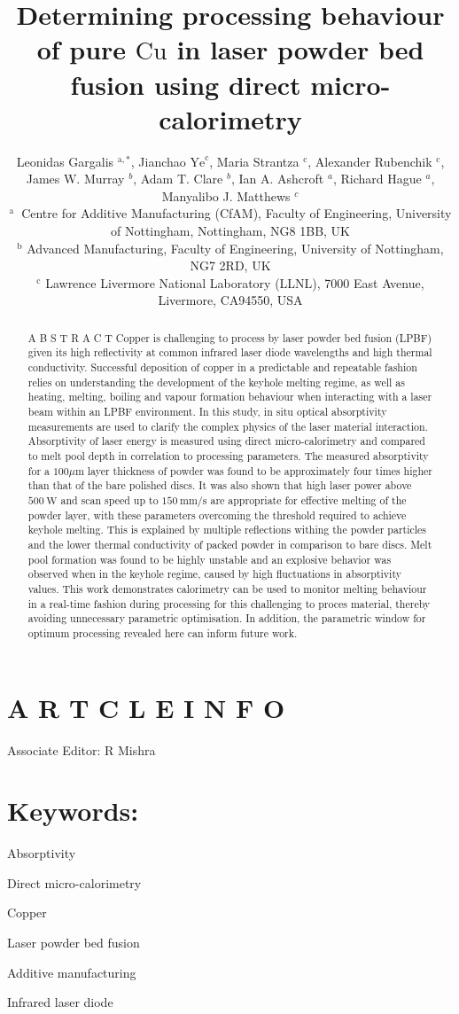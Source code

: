 \documentclass[10pt]{article}
\title{Determining processing behaviour of pure $\mathrm{Cu}$ in laser powder bed fusion using direct micro-calorimetry }
\author{Leonidas Gargalis ${ }^{\mathrm{a}, *}$, Jianchao $\mathrm{Ye}^{\mathrm{c}}$, Maria Strantza ${ }^{\mathrm{c}}$, Alexander Rubenchik ${ }^{\mathrm{c}}$,\\
James W. Murray ${ }^{b}$, Adam T. Clare ${ }^{b}$, Ian A. Ashcroft ${ }^{a}$, Richard Hague ${ }^{a}$, Manyalibo J. Matthews ${ }^{c}$\\
${ }^{\text {a }}$ Centre for Additive Manufacturing (CfAM), Faculty of Engineering, University of Nottingham, Nottingham, NG8 1BB, UK\\
${ }^{\mathrm{b}}$ Advanced Manufacturing, Faculty of Engineering, University of Nottingham, NG7 2RD, UK\\
${ }^{\mathrm{c}}$ Lawrence Livermore National Laboratory (LLNL), 7000 East Avenue, Livermore, CA94550, USA}
\date{}
\begin{document}
\maketitle


\section*{A R T C L E I N F O}
Associate Editor: R Mishra

\section*{Keywords:}
Absorptivity

Direct micro-calorimetry

Copper

Laser powder bed fusion

Additive manufacturing

Infrared laser diode

\begin{abstract}
A B S T R A C T Copper is challenging to process by laser powder bed fusion (LPBF) given its high reflectivity at common infrared laser diode wavelengths and high thermal conductivity. Successful deposition of copper in a predictable and repeatable fashion relies on understanding the development of the keyhole melting regime, as well as heating, melting, boiling and vapour formation behaviour when interacting with a laser beam within an LPBF environment. In this study, in situ optical absorptivity measurements are used to clarify the complex physics of the laser material interaction. Absorptivity of laser energy is measured using direct micro-calorimetry and compared to melt pool depth in correlation to processing parameters. The measured absorptivity for a $100 \mu \mathrm{m}$ layer thickness of powder was found to be approximately four times higher than that of the bare polished discs. It was also shown that high laser power above $500 \mathrm{~W}$ and scan speed up to $150 \mathrm{~mm} / \mathrm{s}$ are appropriate for effective melting of the powder layer, with these parameters overcoming the threshold required to achieve keyhole melting. This is explained by multiple reflections withing the powder particles and the lower thermal conductivity of packed powder in comparison to bare discs. Melt pool formation was found to be highly unstable and an explosive behavior was observed when in the keyhole regime, caused by high fluctuations in absorptivity values. This work demonstrates calorimetry can be used to monitor melting behaviour in a real-time fashion during processing for this challenging to proces material, thereby avoiding unnecessary parametric optimisation. In addition, the parametric window for optimum processing revealed here can inform future work.
\end{abstract}
\end{document}
